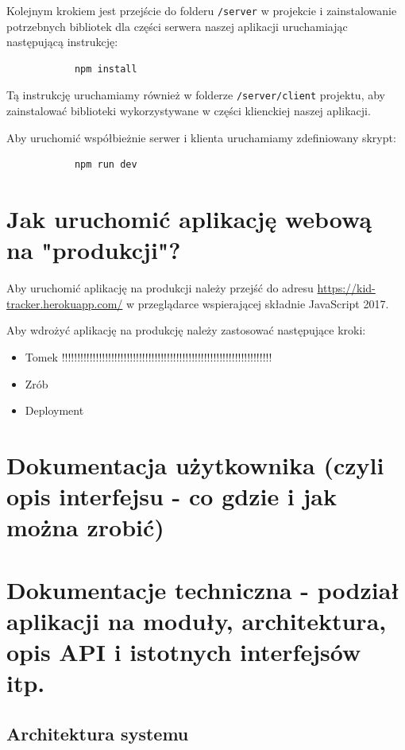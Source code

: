 \documentclass{sprawozdanie-agh}
\begin{document}
		Kolejnym krokiem jest przejście do folderu \lstinline{/server} w projekcie i zainstalowanie potrzebnych bibliotek dla części serwera naszej aplikacji uruchamiając następującą instrukcję:

		\begin{lstlisting}
			npm install
		\end{lstlisting}

		Tą instrukcję uruchamiamy również w folderze \lstinline{/server/client} projektu, aby zainstalować biblioteki wykorzystywane w części klienckiej naszej aplikacji.

		Aby uruchomić współbieżnie serwer i klienta uruchamiamy zdefiniowany skrypt:

		\begin{lstlisting}
			npm run dev
		\end{lstlisting}

	\section{Jak uruchomić aplikację webową na "produkcji"?}

		Aby uruchomić aplikację na produkcji należy przejść do adresu \href{https://kid-tracker.herokuapp.com/}{https://kid-tracker.herokuapp.com/} w przeglądarce wspierającej składnie JavaScript 2017.

		Aby wdrożyć aplikację na produkcję należy zastosować następujące kroki:

		\begin{itemize}
			\item Tomek !!!!!!!!!!!!!!!!!!!!!!!!!!!!!!!!!!!!!!!!!!!!!!!!!!!!!!!!!!!!!!!!!!!!
			\item Zrób
			\item Deployment
		\end{itemize}

	\section{Dokumentacja użytkownika (czyli opis interfejsu - co gdzie i jak można zrobić)}

	\section{Dokumentacje techniczna - podział aplikacji na moduły, architektura, opis API i istotnych interfejsów itp.}

		\subsection{Architektura systemu}
		
\end{document}
